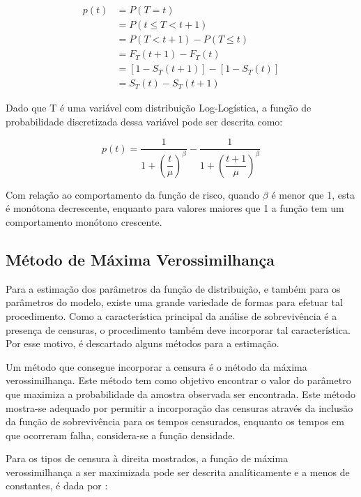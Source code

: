 \documentclass[
	article,
	12pt,				%
	openright,			%
	twoside,			%
	a4paper,			%
	english,			%
	french,				%
	spanish,			%
	brazil				%
	]{abntex2}
\begin{document}
\begin{equation}
  \begin{split}
  p(t) &= P(T=t) \\
  &=P(t\le T < t+1) \\
  &=P(T < t+1) - P(T \le t) \\
  &=F_T(t+1) - F_T(t) \\
  &=[1 - S_T(t+1)] - [1 - S_T(t)] \\
  &=S_T(t) - S_T(t+1)
  \end{split}
\end{equation}

Dado que T é uma variável com distribuição Log-Logística, a função de probabilidade discretizada dessa variável pode ser descrita como:

\begin{equation} \label{eq:ptLL}
p(t) = \dfrac{1}{1 + \left(\dfrac{t}{\mu}\right)^{\beta}} - \dfrac{1}{1 + \left(\dfrac{t+1}{\mu}\right)^{\beta}}
\end{equation}

Com relação ao comportamento da função de risco, quando $\beta$ é menor que 1, esta é monótona decrescente, enquanto para valores maiores que 1 a função tem um comportamento monótono crescente.


\subsection{Método de Máxima Verossimilhança}

Para a estimação dos parâmetros da função de distribuição, e também para os parâmetros do modelo, existe uma grande variedade de formas para efetuar tal procedimento. Como a característica principal da análise de sobrevivência é a presença de censuras, o procedimento também deve incorporar tal característica. Por esse motivo, é descartado alguns métodos para a estimação.

Um método que consegue incorporar a censura é o método da máxima verossimilhança. Este método tem como objetivo encontrar o valor do parâmetro que maximiza a probabilidade da amostra observada ser encontrada. Este método mostra-se adequado por permitir a incorporação das censuras através da inclusão da função de sobrevivência para os tempos censurados, enquanto os tempos em que ocorreram falha, considera-se a função densidade.

Para os tipos de censura à direita mostrados, a função de máxima verossimilhança a ser maximizada pode ser descrita analíticamente e a menos de constantes, é dada por \cite{colosimo;2006}:
\end{document}
